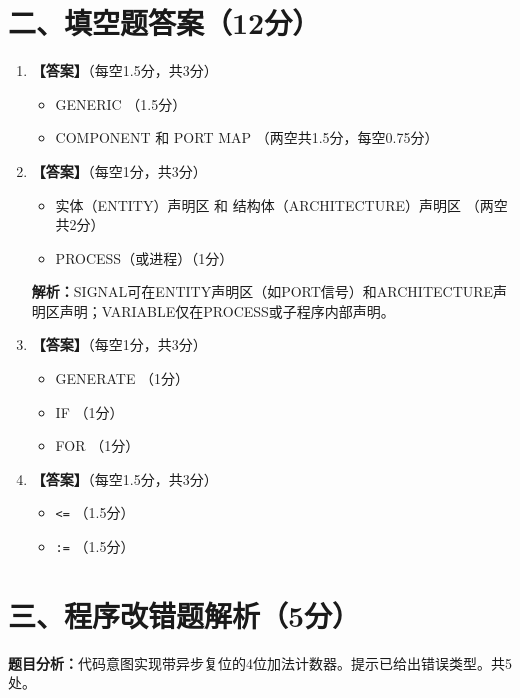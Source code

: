 \section{二、填空题答案（12分）}

\begin{enumerate}[label=\arabic*.]

\item \textbf{【答案】}（每空1.5分，共3分）
\begin{itemize}
  \item GENERIC \hfill（1.5分）
  \item COMPONENT 和 PORT MAP \hfill（两空共1.5分，每空0.75分）
\end{itemize}

\item \textbf{【答案】}（每空1分，共3分）
\begin{itemize}
  \item 实体（ENTITY）声明区 和 结构体（ARCHITECTURE）声明区 \hfill（两空共2分）
  \item PROCESS（或进程）\hfill（1分）
\end{itemize}
\textbf{解析：}SIGNAL可在ENTITY声明区（如PORT信号）和ARCHITECTURE声明区声明；VARIABLE仅在PROCESS或子程序内部声明。

\item \textbf{【答案】}（每空1分，共3分）
\begin{itemize}
  \item GENERATE \hfill（1分）
  \item IF \hfill（1分）
  \item FOR \hfill（1分）
\end{itemize}

\item \textbf{【答案】}（每空1.5分，共3分）
\begin{itemize}
  \item \texttt{<=} \hfill（1.5分）
  \item \texttt{:=} \hfill（1.5分）
\end{itemize}

\end{enumerate}

\section{三、程序改错题解析（5分）}

\textbf{题目分析：}代码意图实现带异步复位的4位加法计数器。提示已给出错误类型。共5处。

